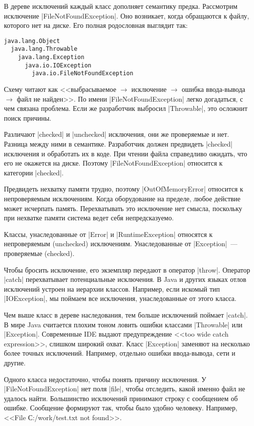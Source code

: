 В дереве исключений каждый класс дополняет семантику предка. Рассмотрим
исключение \spverb|FileNotFoundException|. Оно возникает, когда обращаются к
файлу, которого нет на диске. Его полная родословная выглядит так:

\begin{verbatim}
java.lang.Object
  java.lang.Throwable
    java.lang.Exception
      java.io.IOException
        java.io.FileNotFoundException
\end{verbatim}

Схему читают как <<выбрасываемое $\to$ исключение $\to$ ошибка ввода-вывода
$\to$ файл не найден>>. По имени \spverb|FileNotFoundException| легко
догадаться, с чем связана проблема. Если же разработчик выбросил
\spverb|Throwable|, это осложнит поиск причины.

Различают \spverb|checked| и \spverb|unchecked| исключения, они же проверяемые и
нет. Разница между ними в семантике. Разработчик должен предвидеть
\spverb|checked| исключения и обработать их в коде. При чтении файла справедливо
ожидать, что его не окажется на диске. Поэтому \spverb|FileNotFoundException|
относится к категории \spverb|checked|.

Предвидеть нехватку памяти трудно, поэтому \spverb|OutOfMemoryError| относится к
непроверяемым исключениям. Когда оборудование на пределе, любое действие может
исчерпать память. Перехватывать это исключение нет смысла, поскольку при
нехватке памяти система ведет себя непредсказуемо.

Классы, унаследованные от \spverb|Error| и \spverb|RuntimeException| относятся к
непроверяемым (unchecked) исключениям. Унаследованные от \spverb|Exception|~---
проверяемые (checked).

Чтобы бросить исключение, его экземпляр передают в оператор
\spverb|throw|. Оператор \spverb|catch| перехватывает потенциальные
исключения. В Java и других языках отлов исключений устроен на иерархии
классов. Например, если искомый тип \spverb|IOException|, мы поймаем все
исключения, унаследованные от этого класса.

Чем выше класс в дереве наследования, тем больше исключений поймает
\spverb|catch|. В мире Java считается плохим тоном ловить ошибки классами
\spverb|Throwable| или \spverb|Exception|. Современные IDE выдают предупреждение
<<too wide catch expression>>, слишком широкий охват. Класс \spverb|Exception|
заменяют на несколько более точных исключений. Например, отдельно ошибки
ввода-вывода, сети и другие.

Одного класса недостаточно, чтобы понять причину исключения. У
\spverb|FileNotFoundException| нет поля \spverb|file|, чтобы отследить, какой
именно файл не удалось найти. Большинство исключений принимают строку с
сообщением об ошибке. Сообщение формируют так, чтобы было удобно
человеку. Например, <<File С:/work/test.txt not found>>.

